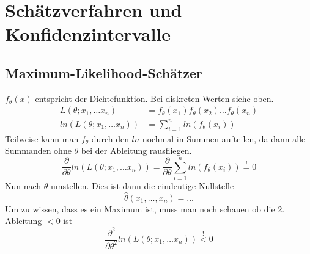 \documentclass[
ngerman,
accentcolor=9c,%
type=intern,
marginpar=false
]{tudapub}
\begin{document}
    \section{Schätzverfahren und Konfidenzintervalle}
        \subsection{Maximum-Likelihood-Schätzer}
            $f_\theta(x)$ entspricht der Dichtefunktion. Bei diskreten Werten siehe oben.
            \begin{align*}
                L(\theta; x_1, \dots x_n) &= f_\theta(x_1)f_\theta(x_2)\dots f_\theta(x_n)\\
                ln\left( L(\theta; x_1, \dots x_n) \right) &= \sum_{i=1}^{n}ln\left( f_\theta(x_i) \right)
            \end{align*}
            Teilweise kann man $f_\theta$ durch den $ln$ nochmal in Summen aufteilen, da dann alle Summanden ohne $\theta$ bei der Ableitung rausfliegen.
            \begin{equation*}
                \frac{\partial}{\partial \theta} ln\left( L(\theta; x_1, \dots x_n) \right) =
                \frac{\partial}{\partial \theta} \sum_{i=1}^{n}ln\left( f_\theta(x_i) \right) \overset{!}{=} 0
            \end{equation*}
            Nun nach $\theta$ umstellen. Dies ist dann die eindeutige Nullstelle
            \begin{equation*}
                \hat{\theta}(x_1, \dots, x_n) = ...
            \end{equation*}
            Um zu wissen, dass es ein Maximum ist, muss man noch schauen ob die 2. Ableitung $<0$ ist
            \begin{equation*}
                \frac{\partial^2}{\partial \theta^2} ln\left( L(\theta; x_1, \dots x_n) \right) \overset{!}{<} 0
            \end{equation*}
    \newpage
\end{document}
